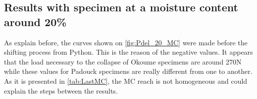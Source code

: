 \newpage
\subsection{Results with specimen at a moisture content around 20\% }

As explain before, the curves shown on \ref{fig:Pdel_20_MC} were made before the shifting process from Python. This is the reason of the negative values. It appears that the load necessary to the collapse of Okoume specimens are around 270\si{\newton} while these values for Padouck specimens are really different from one to another. As it is presented in \ref{tab:LastMC}, the MC reach is not homogeneous and could explain the steps between the results. 
